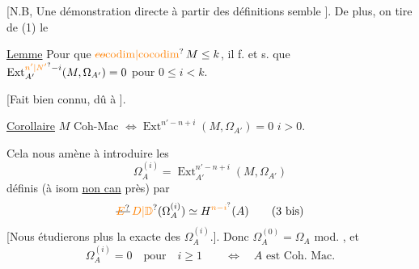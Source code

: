 [N.B, Une démonstration directe à partir
des définitions semble ]. De plus,
on tire de (1) le

\uline{Lemme} Pour que $\operatorname{\unsure{\deleted{co}codim|cocodim}}M\leq k$, il f. et
s. que $\operatorname{Ext}_{A'}^{\unsure{n'|N'}-i}(M,\Omega_{A'})=0$ pour $0\leq i<k$.

[Fait bien connu, dû à ]. \deleted{\unsure{\S}}

\uline{Corollaire} $M$ Coh-Mac $\Longleftrightarrow\operatorname{Ext}^{n'-n+i}(M,\Omega_{A'})=0$
 $i>0$.

Cela nous amène à introduire les
\[
\Omega_A^{(i)}=\operatorname{Ext}_{A'}^{n'-n+i}(M,\Omega_{A'})\tag*{(3)}
\]
définis (à isom \uline{non can} près) par
\[
\deleted{\unsure{E}}\,\unsure{D|\mathbb D}(\Omega_A^{(i)})\simeq H^{\unsure{n-i}}(A)\tag*{(3 bis)}
\]
[Nous étudierons plus  la  exacte des $\Omega_A^{(i)}$.].
Donc $\Omega_A^{(0)}=\Omega_A$ mod. , et
\[
\Omega_A^{(i)}=0\quad\text{pour}\quad i\geq1\qquad\Longleftrightarrow\quad A\text{ est Coh. Mac.}
\]
\endgroup


